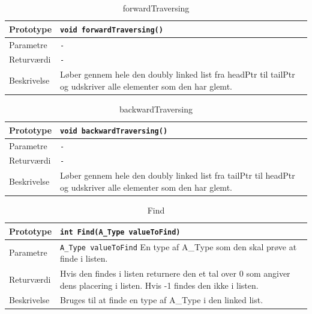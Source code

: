 \begin{table}[ht]
\begin{tabularx}{\textwidth}{| L{2.5 cm} | Z |} \hline
Prototype & \texttt{void forwardTraversing()} \\\hline
Parametre & \texttt{-} \\\hline
Returværdi & \texttt{-} \\\hline
Beskrivelse & Løber gennem hele den doubly linked list fra headPtr til tailPtr og udskriver alle elementer som den har glemt. \\\hline
\end{tabularx}
\caption{forwardTraversing}
\label{table:DoublyLinkedList_forwardTraversing}
\end{table}


\begin{table}[ht]
\begin{tabularx}{\textwidth}{| L{2.5 cm} | Z |} \hline
Prototype & \texttt{void backwardTraversing()} \\\hline
Parametre & \texttt{-} \\\hline
Returværdi & \texttt{-} \\\hline
Beskrivelse & Løber gennem hele den doubly linked list fra tailPtr til headPtr og udskriver alle elementer som den har glemt. \\\hline
\end{tabularx}
\caption{backwardTraversing}
\label{table:DoublyLinkedList_backwardTraversing}
\end{table}


\begin{table}[ht]
\begin{tabularx}{\textwidth}{| L{2.5 cm} | Z |} \hline
Prototype & \texttt{int Find(A\_Type valueToFind)} \\\hline
Parametre & \texttt{A\_Type valueToFind} \newline
En type af A\_Type som den skal prøve at finde i listen. \\\hline
Returværdi & Hvis den findes i listen returnere den et tal over 0 som angiver dens placering i listen. Hvis -1 findes den ikke i listen. \\\hline
Beskrivelse & Bruges til at finde en type af A\_Type i den linked list. \\\hline
\end{tabularx}
\caption{Find}
\label{table:DoublyLinkedList_Find}
\end{table}

